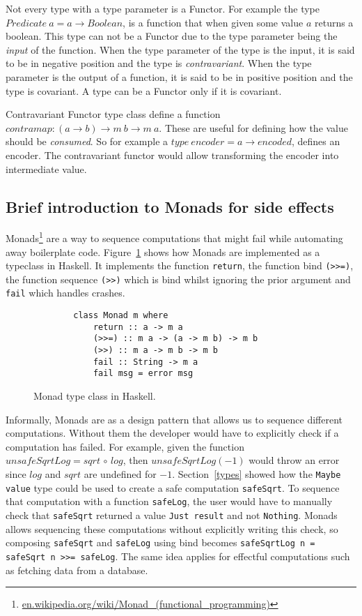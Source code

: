 Not every type with a type parameter is a Functor. For example the type
$Predicate\ a = a \rightarrow Boolean$, is a function that when given some value
$a$ returns a boolean. This type can not be a Functor due to the type parameter
being the \textit{input} of the function. When the type parameter of the type is
the input, it is said to be in negative position and the type is
\textit{contravariant}.  When the type parameter is the output of a function, it
is said to be in positive position and the type is covariant. A type can be a
Functor only if it is covariant.

Contravariant Functor type class define a function $contramap : (a\rightarrow b)
\rightarrow m\ b \rightarrow m\ a$. These are useful for defining how the value
should be \textit{consumed}. So for example a $type\ encoder = a\rightarrow
encoded$, defines an encoder. The contravariant functor would allow transforming
the encoder into intermediate value.

\subsection{Brief introduction to Monads for side effects}\label{monads}

Monads\footnote{\url{en.wikipedia.org/wiki/Monad_(functional_programming)}} are
a way to sequence computations that might fail while automating away boilerplate
code. Figure~\ref{monadclass} shows how Monads are implemented as a typeclass in
Haskell. It implements the function \texttt{return}, the function bind
\texttt{(>>=)}, the function sequence \texttt{(>>)} which is bind whilst
ignoring the prior argument and \texttt{fail} which handles crashes.

\begin{figure}[H]
    \begin{lstlisting}
        class Monad m where  
            return :: a -> m a  
            (>>=) :: m a -> (a -> m b) -> m b  
            (>>) :: m a -> m b -> m b  
            fail :: String -> m a  
            fail msg = error msg 
    \end{lstlisting}
    \caption{Monad type class in Haskell.}
    \label{monadclass}
\end{figure}

Informally, Monads are as a design pattern that allows us to sequence different
computations. Without them the developer would have to explicitly check if a
computation has failed. For example, given the function $unsafeSqrtLog =
sqrt\,\circ\,log$, then $unsafeSqrtLog(-1)$ would throw an error since $log$ and
$sqrt$ are undefined for $-1$.  Section~\ref{types} showed how the \texttt{Maybe
value} type could be used to create a safe computation \texttt{safeSqrt}.  To
sequence that computation with a function \texttt{safeLog}, the user would have
to manually check that \texttt{safeSqrt} returned a value \texttt{Just result}
and not \texttt{Nothing}. Monads allows sequencing these computations without
explicitly writing this check, so composing \texttt{safeSqrt} and
\texttt{safeLog} using bind becomes \texttt{safeSqrtLog n = safeSqrt n >>=
safeLog}. The same idea applies for effectful computations such as fetching data
from a database.

